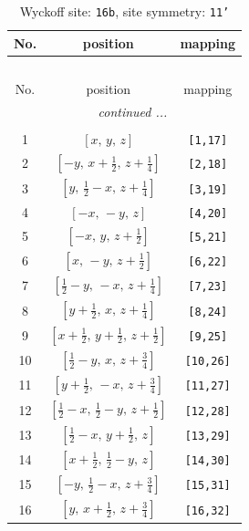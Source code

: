 \documentclass[fleqn,8pt]{jsarticle}
\begin{document}
\begin{longtable}{ccc}
\caption{Wyckoff site: {\tt 16b}, site symmetry: {\tt 11'}}
 \\
 \hline \hline
No. & position & mapping \\ \hline \endfirsthead

\multicolumn{2}{l}{\tablename\ \thetable{}} \\
 \hline \hline
No. & position & mapping \\ \hline \endhead

 \hline \hline
\multicolumn{2}{r}{\footnotesize\it continued ...} \\ \endfoot

 \hline \hline
\multicolumn{2}{r}{} \\ \endlastfoot

1 & $\left[ x,\, y,\, z \right]$ & {\tt [1,17]} \\ \hline
2 & $\left[ - y,\, x + \frac{1}{2},\, z + \frac{1}{4} \right]$ & {\tt [2,18]} \\ \hline
3 & $\left[ y,\, \frac{1}{2} - x,\, z + \frac{1}{4} \right]$ & {\tt [3,19]} \\ \hline
4 & $\left[ - x,\, - y,\, z \right]$ & {\tt [4,20]} \\ \hline
5 & $\left[ - x,\, y,\, z + \frac{1}{2} \right]$ & {\tt [5,21]} \\ \hline
6 & $\left[ x,\, - y,\, z + \frac{1}{2} \right]$ & {\tt [6,22]} \\ \hline
7 & $\left[ \frac{1}{2} - y,\, - x,\, z + \frac{1}{4} \right]$ & {\tt [7,23]} \\ \hline
8 & $\left[ y + \frac{1}{2},\, x,\, z + \frac{1}{4} \right]$ & {\tt [8,24]} \\ \hline
9 & $\left[ x + \frac{1}{2},\, y + \frac{1}{2},\, z + \frac{1}{2} \right]$ & {\tt [9,25]} \\ \hline
10 & $\left[ \frac{1}{2} - y,\, x,\, z + \frac{3}{4} \right]$ & {\tt [10,26]} \\ \hline
11 & $\left[ y + \frac{1}{2},\, - x,\, z + \frac{3}{4} \right]$ & {\tt [11,27]} \\ \hline
12 & $\left[ \frac{1}{2} - x,\, \frac{1}{2} - y,\, z + \frac{1}{2} \right]$ & {\tt [12,28]} \\ \hline
13 & $\left[ \frac{1}{2} - x,\, y + \frac{1}{2},\, z \right]$ & {\tt [13,29]} \\ \hline
14 & $\left[ x + \frac{1}{2},\, \frac{1}{2} - y,\, z \right]$ & {\tt [14,30]} \\ \hline
15 & $\left[ - y,\, \frac{1}{2} - x,\, z + \frac{3}{4} \right]$ & {\tt [15,31]} \\ \hline
16 & $\left[ y,\, x + \frac{1}{2},\, z + \frac{3}{4} \right]$ & {\tt [16,32]} \\
\end{longtable}
\end{document}
